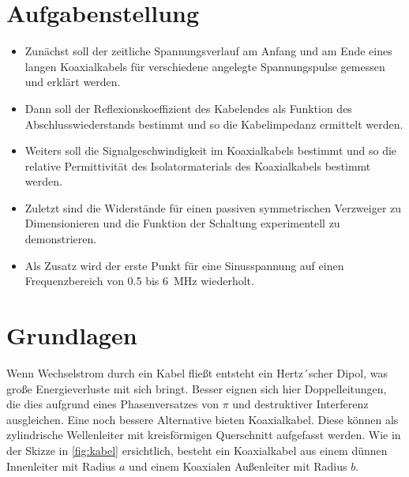 \documentclass[11pt,ngerman]{scrartcl}
\begin{document}

\tableofcontents
\newpage

\section{Aufgabenstellung\label{Auf0}}

\begin{itemize}
	\item Zunächst soll der zeitliche Spannungsverlauf am Anfang und am Ende eines langen
	      Koaxialkabels für verschiedene angelegte Spannungspulse gemessen und erklärt
	      werden.
	\item Dann soll der Reflexionskoeffizient des Kabelendes als Funktion des
	      Abschlusswiederstands bestimmt und so die Kabelimpedanz ermittelt werden.
	\item Weiters soll die Signalgeschwindigkeit im Koaxialkabels bestimmt und so die
	      relative Permittivität des Isolatormaterials des Koaxialkabels bestimmt werden.
	\item Zuletzt sind die Widerstände für einen passiven symmetrischen Verzweiger zu
	      Dimensionieren und die Funktion der Schaltung experimentell zu demonstrieren.
	\item Als Zusatz wird der erste Punkt für eine Sinusspannung auf einen
	      Frequenzbereich von 0.5 bis \SI{6}{MHz} wiederholt.
\end{itemize}

\section{Grundlagen}




Wenn Wechselstrom durch ein Kabel fließt entsteht ein Hertz´scher Dipol, was
große Energieverluste mit sich bringt. Besser eignen sich hier Doppelleitungen,
die dies aufgrund eines Phasenversatzes von $\pi$ und destruktiver Interferenz
ausgleichen. Eine noch bessere Alternative bieten Koaxialkabel. Diese können
als zylindrische Wellenleiter mit kreisförmigen Querschnitt aufgefasst werden.
Wie in der Skizze in \autoref{fig:kabel} ersichtlich, besteht ein Koaxialkabel
aus einem dünnen Innenleiter mit Radius $a$ und einem Koaxialen Außenleiter mit
Radius $b$. \cite{Demtroeder2013}
\end{document}
